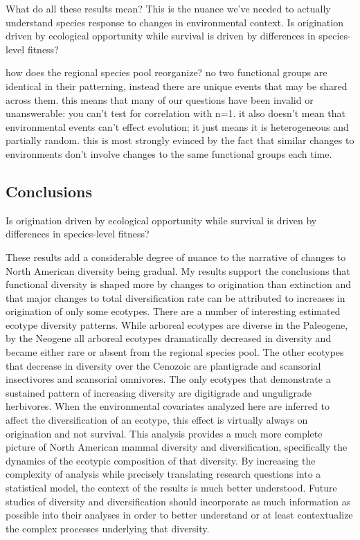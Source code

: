 \documentclass[12pt,letterpaper]{article}
\begin{document}
What do all these results mean? This is the nuance we've needed to actually understand species response to changes in environmental context. Is origination driven by ecological opportunity while survival is driven by differences in species-level fitness?

how does the regional species pool reorganize? no two functional groups are identical in their patterning, instead there are unique events that may be shared across them. this means that many of our questions have been invalid or unanswerable: you can't test for correlation with n=1. it also doesn't mean that environmental events can't effect evolution; it just means it is heterogeneous and partially random. this is most strongly evinced by the fact that similar changes to environments don't involve changes to the same functional groups each time.






\subsection*{Conclusions}

Is origination driven by ecological opportunity while survival is driven by differences in species-level fitness?

These results add a considerable degree of nuance to the narrative of changes to North American diversity being gradual. My results support the conclusions that functional diversity is shaped more by changes to origination than extinction and that major changes to total diversification rate can be attributed to increases in origination of only some ecotypes. There are a number of interesting estimated ecotype diversity patterns. While arboreal ecotypes are diverse in the Paleogene, by the Neogene all arboreal ecotypes dramatically decreased in diversity and became either rare or absent from the regional species pool. The other ecotypes that decrease in diversity over the Cenozoic are plantigrade and scansorial insectivores and scansorial omnivores. The only ecotypes that demonstrate a sustained pattern of increasing diversity are digitigrade and unguligrade herbivores. When the environmental covariates analyzed here are inferred to affect the diversification of an ecotype, this effect is virtually always on origination and not survival. This analysis provides a much more complete picture of North American mammal diversity and diversification, specifically the dynamics of the ecotypic composition of that diversity. By increasing the complexity of analysis while precisely translating research questions into a statistical model, the context of the results is much better understood. Future studies of diversity and diversification should incorporate as much information as possible into their analyses in order to better understand or at least contextualize the complex processes underlying that diversity.
\end{document}
